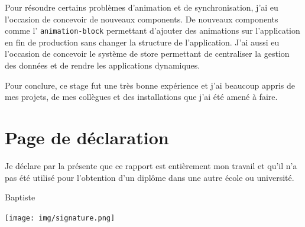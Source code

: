 \documentclass{article}
\begin{document}
    Pour résoudre certains problèmes d'animation et de synchronisation, j'ai eu l'occasion de concevoir de nouveaux components.
    De nouveaux components comme l’ \texttt{animation-block} permettant d'ajouter des animations sur l'application en fin de production sans changer la structure de l'application.
    J'ai aussi eu l'occasion de concevoir le système de store permettant de centraliser la gestion des données et de rendre les applications dynamiques.

    Pour conclure, ce stage fut une très bonne expérience et j'ai beaucoup appris de mes projets, de mes collègues et des installations que j'ai été amené à faire.

    \clearpage

    \section{Page de déclaration}

    \vspace{\fill}

    Je déclare par la présente que ce rapport est entièrement mon travail et qu'il n'a pas été utilisé pour l'obtention d'un diplôme dans une autre école ou université.

    \vspace{3cm}

    \hspace{\fill}Baptiste 

    \hspace{\fill}\texttt{[image: img/signature.png]}

    \vspace{\fill}
\end{document}
